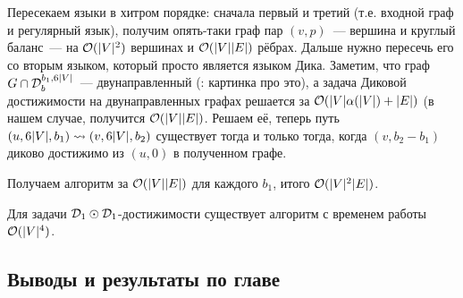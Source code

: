 \begin{enumerate}
    Пересекаем языки в хитром порядке: сначала первый и третий (т.е. входной граф и регулярный язык), получим опять-таки граф пар $(v, p)$~--- вершина и круглый баланс~--- на $\mathcal{O}(|V|^2)$ вершинах и $\mathcal{O}(|V||E|)$ рёбрах. Дальше нужно пересечь его со вторым языком, который просто является языком Дика. Заметим, что граф $G \cap \mathcal{D}_b^{b_1, 6|V|}$~--- двунаправленный (\TODO: картинка про это), а задача Диковой достижимости на двунаправленных графах решается за $\mathcal{O}(|V| \alpha(|V|) + |E|)$ (в нашем случае, получится $\mathcal{O}(|V||E|)$. Решаем её, теперь путь $(u, 6|V|, b_1) \rightsquigarrow (v, 6|V|, b_2)$ существует тогда и только тогда, когда $(v, b_2 - b_1)$ диково достижимо из $(u, 0)$ в полученном графе.

    Получаем алгоритм за $\mathcal{O}(|V||E|)$ для каждого $b_1$, итого $\mathcal{O}(|V|^2 |E|)$.






\end{enumerate}

\begin{theorem}
  Для задачи $\mathcal{D}_1 \odot \mathcal{D}_1$-достижимости существует алгоритм с временем работы $\mathcal{O}(|V|^4)$.
\end{theorem}

\subsection{Выводы и результаты по главе}

\TODO